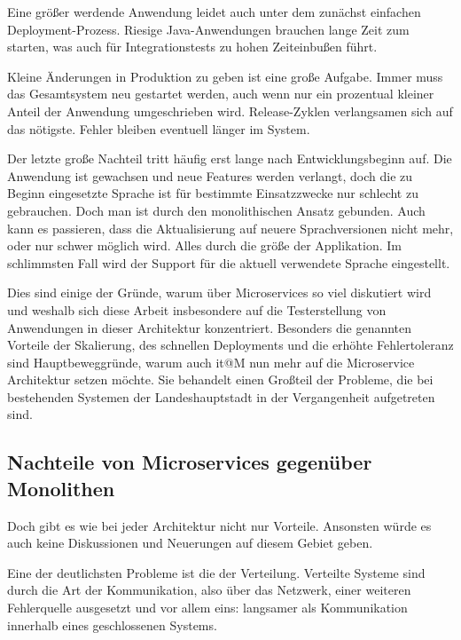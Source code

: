\documentclass[12pt,a4paper,bibliography=totocnumbered,listof=totocnumbered]{scrartcl}
\begin{document}
Eine größer werdende Anwendung leidet auch unter dem zunächst einfachen Deployment-Prozess. Riesige Java-Anwendungen brauchen lange Zeit zum starten, was auch für Integrationstests zu hohen Zeiteinbußen führt.

Kleine Änderungen in Produktion zu geben ist eine große Aufgabe. Immer muss das Gesamtsystem neu gestartet werden, auch wenn nur ein prozentual kleiner Anteil der Anwendung umgeschrieben wird. Release-Zyklen verlangsamen sich auf das nötigste. Fehler bleiben eventuell länger im System.

Der letzte große Nachteil tritt häufig erst lange nach Entwicklungsbeginn auf. Die Anwendung ist gewachsen und neue Features werden verlangt, doch die zu Beginn eingesetzte Sprache ist für bestimmte Einsatzzwecke nur schlecht zu gebrauchen. Doch man ist durch den monolithischen Ansatz gebunden. Auch kann es passieren, dass die Aktualisierung auf neuere Sprachversionen nicht mehr, oder nur schwer möglich wird. Alles durch die größe der Applikation. Im schlimmsten Fall wird der Support für die aktuell verwendete Sprache eingestellt.\cite{richardson}

Dies sind einige der Gründe, warum über Microservices so viel diskutiert wird und weshalb sich diese Arbeit insbesondere auf die Testerstellung von Anwendungen in dieser Architektur konzentriert. Besonders die genannten Vorteile der Skalierung, des schnellen Deployments und die erhöhte Fehlertoleranz sind Hauptbeweggründe, warum auch it@M nun mehr auf die Microservice Architektur setzen möchte. Sie behandelt einen Großteil der Probleme, die bei bestehenden Systemen der Landeshauptstadt in der Vergangenheit aufgetreten sind.

\subsection{Nachteile von Microservices gegenüber Monolithen}\label{ch:ms-mon-cons}

Doch gibt es wie bei jeder Architektur nicht nur Vorteile. Ansonsten würde es auch keine Diskussionen und Neuerungen auf diesem Gebiet geben.

Eine der deutlichsten Probleme ist die der Verteilung. Verteilte Systeme sind durch die Art der Kommunikation, also über das Netzwerk, einer weiteren Fehlerquelle ausgesetzt und vor allem eins: langsamer als Kommunikation innerhalb eines geschlossenen Systems\cite{tradeoffs}. 
\end{document}
